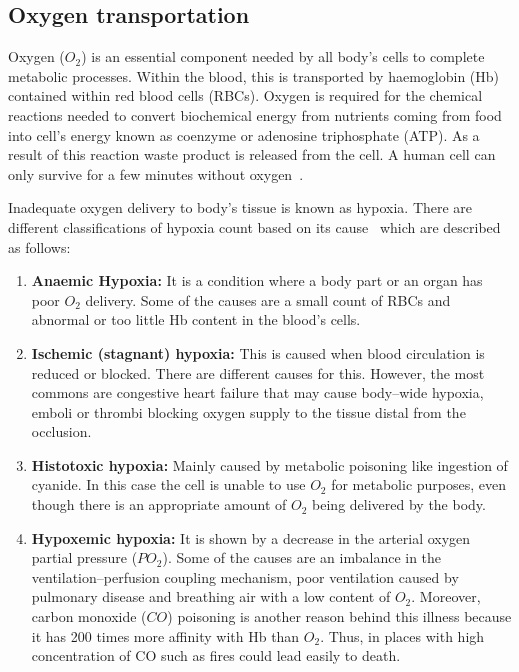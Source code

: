 \subsection{Oxygen transportation}
\label{section literature 1.2}
Oxygen ($O_2$) is an essential component needed by all body's cells to complete metabolic processes. Within the blood, this is transported by haemoglobin (Hb) contained within red blood cells (RBCs). Oxygen is required for the chemical reactions needed to convert biochemical energy from nutrients coming from food into cell's energy known as coenzyme or adenosine triphosphate (ATP). As a result of this reaction waste product is released from the cell. A human cell can only survive for a few minutes without oxygen~\cite{culmsee2005apoptosis}.

Inadequate oxygen delivery to body's tissue is known as hypoxia. There are different classifications of hypoxia count based on its cause~\cite{marieb2007human} which are described as follows: 

\begin{enumerate}
    \item \textbf{Anaemic Hypoxia:} It is a condition where a body part or an organ has poor $O_2$ delivery. Some of the causes are a small count of RBCs and abnormal or too little Hb content in the blood's cells.
    \item \textbf{Ischemic (stagnant) hypoxia: }This is caused when blood circulation is reduced or blocked. There are different causes for this. However, the most commons are congestive heart failure that may cause body–wide hypoxia, emboli or thrombi blocking oxygen supply to the tissue distal from the occlusion. 
    \item \textbf{Histotoxic hypoxia: }Mainly caused by metabolic poisoning like ingestion of cyanide. In this case the cell is unable to use $O_2$ for metabolic purposes, even though there is an appropriate amount of $O_2$ being delivered by the body.
    \item \textbf{Hypoxemic hypoxia:} It is shown by a decrease in the arterial oxygen partial pressure ($PO_2$). Some of the causes are an imbalance in the ventilation–perfusion coupling mechanism, poor ventilation caused by pulmonary disease and breathing air with a low content of $O_2$. Moreover, carbon monoxide ($CO$) poisoning is another reason behind this illness because it has \num{200} times more affinity with Hb than $O_2$. Thus, in places with high concentration of CO such as fires could lead easily to death.
\end{enumerate}

